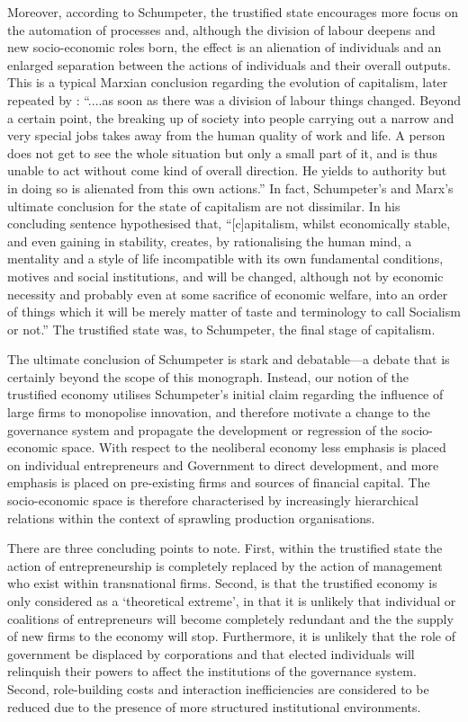 Moreover, according to Schumpeter, the trustified state encourages more focus on the automation of processes and, although the division of labour deepens and new socio-economic roles born, the effect is an alienation of individuals and an enlarged separation between the actions of individuals and their overall outputs. This is a typical Marxian conclusion regarding the evolution of capitalism, later repeated by \citet[p.~77]{Milgram1973}: ``....as soon as there was a division of labour things changed. Beyond a certain point, the breaking up of society into people carrying out a narrow and very special jobs takes away from the human quality of work and life. A person does not get to see the whole situation but only a small part of it, and is thus unable to act without come kind of overall direction. He yields to authority but in doing so is alienated from this own actions.'' In fact, Schumpeter's and Marx's ultimate conclusion for the state of capitalism are not dissimilar. In his concluding sentence \citet[p.~386]{Schumpeter1928} hypothesised that, ``[c]apitalism, whilst economically stable, and even gaining in stability, creates, by rationalising the human mind, a mentality and a style of life incompatible with its own fundamental conditions, motives and social institutions, and will be changed, although not by economic necessity and probably even at some sacrifice of economic welfare, into an order of things which it will be merely matter of taste and terminology to call Socialism or not.'' The trustified state was, to Schumpeter, the final stage of capitalism.

The ultimate conclusion of Schumpeter is stark and debatable---a debate that is certainly beyond the scope of this monograph. Instead, our notion of the trustified economy utilises Schumpeter's initial claim regarding the influence of large firms to monopolise innovation, and therefore motivate a change to the governance system and propagate the development or regression of the socio-economic space. With respect to the neoliberal economy less emphasis is placed on individual entrepreneurs and Government to direct development, and more emphasis is placed on pre-existing firms and sources of financial capital. The socio-economic space is therefore characterised by increasingly hierarchical relations within the context of sprawling production organisations.

There are three concluding points to note. First, within the trustified state the action of entrepreneurship is completely replaced by the action of management who exist within transnational firms. Second, is that the trustified economy is only considered as a `theoretical extreme', in that it is unlikely that individual or coalitions of entrepreneurs will become completely redundant and the the supply of new firms to the economy will stop. Furthermore, it is unlikely that the role of government be displaced by corporations and that elected individuals will relinquish their powers to affect the institutions of the governance system. Second, role-building costs and interaction inefficiencies are considered to be reduced due to the presence of more structured institutional environments.

